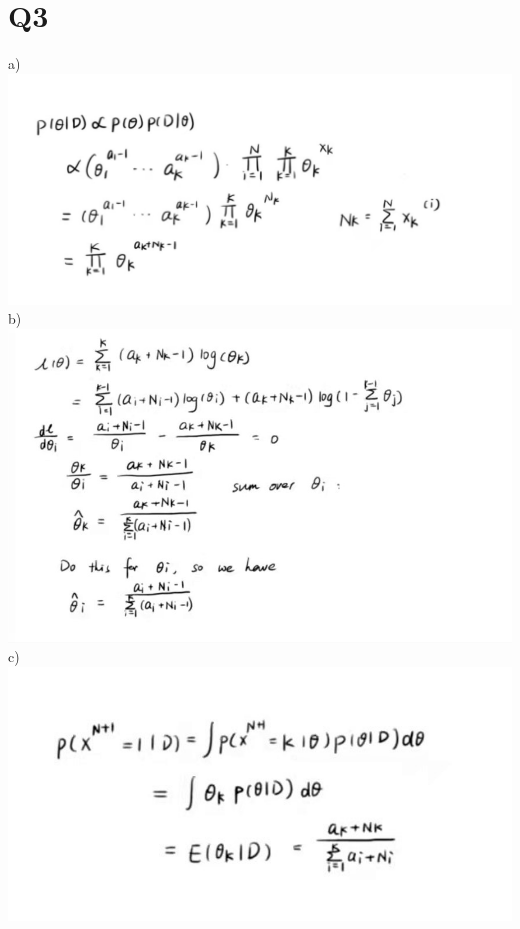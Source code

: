 \documentclass[12pt]{article}
\begin{document}
\begin{enumerate}[label=\alph*)]
	\end{enumerate}
	
	\newpage
	\section*{Q3}
	a)\\ \includegraphics[scale=0.4]{3a.jpg}\\
	b)\\ \includegraphics[scale=0.6]{3b.jpg}\\
	c)\\ \includegraphics[scale=0.5]{3c.jpg}
\end{document}
